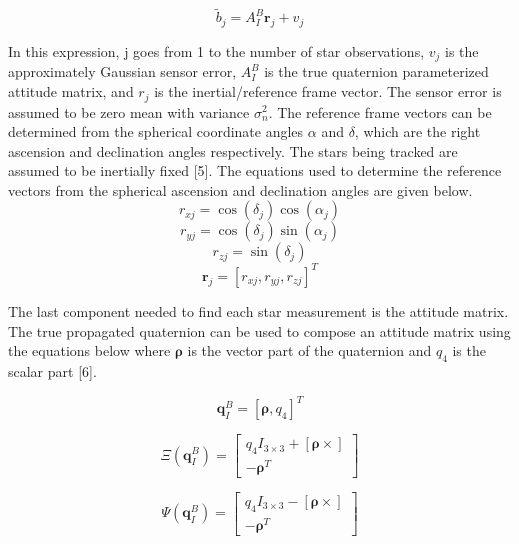 \documentclass[12pt]{report}
\begin{document}
\begin{equation}
	\tilde{b}_j = A_I^B\pmb{r}_j + v_j     
\end{equation}

\noindent In this expression, j goes from 1 to the number of star observations, $v_j$ is the approximately Gaussian sensor error, $A_I^B$ is the true quaternion parameterized attitude matrix, and $r_j$ is the inertial/reference frame vector. The sensor error is assumed to be zero mean with variance $\sigma_n^2$. The reference frame vectors can be determined from the spherical coordinate angles $\alpha$ and $\delta$, which are the right ascension and declination angles respectively. The stars being tracked are assumed to be inertially fixed [5]. The equations used to determine the reference vectors from the spherical ascension and declination angles are given below.
\begin{equation}
	r_{xj} = \cos(\delta_j) \cos(\alpha_j)   
\end{equation}
\begin{equation}
	r_{yj} = \cos(\delta_j) \sin(\alpha_j)   
\end{equation}
\begin{equation}
	r_{zj} = \sin(\delta_j)  
\end{equation}
\begin{equation}
	\pmb{r}_j = [r_{xj},r_{yj},	r_{zj}] ^T
\end{equation}

\noindent The last component needed to find each star measurement is the attitude matrix. The true propagated quaternion can be used to compose an attitude matrix using the equations below where $\pmb{\rho}$ is the vector part of the quaternion and $q_4$ is the scalar part [6]. 

\begin{equation}
	\pmb{q}_I^B = [\pmb{\rho}, q_4]^T
\end{equation}

\begin{equation}
	\Xi(\pmb{q}_I^B)= \begin{bmatrix}
		q_4I_{3\times3} + [\pmb{\rho}\times] \\
		-\pmb{\rho}^T
	\end{bmatrix}
\end{equation}

\begin{equation}
	\Psi(\pmb{q}_I^B)= \begin{bmatrix}
		q_4I_{3\times3} - [\pmb{\rho}\times] \\
		-\pmb{\rho}^T
	\end{bmatrix}
\end{equation}
\end{document}
